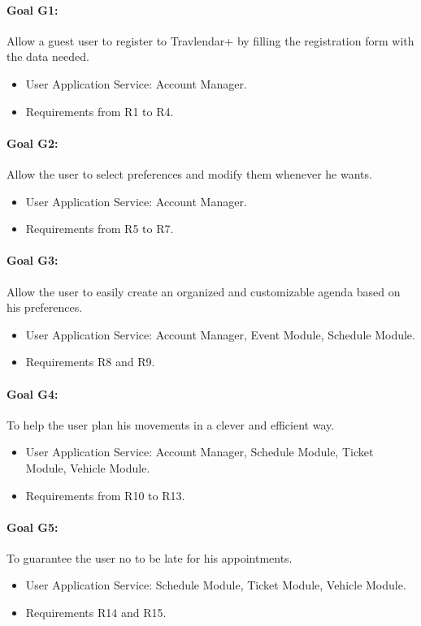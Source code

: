 \documentclass{article}
\begin{document}
		\paragraph{Goal G1:}Allow a guest user to register to Travlendar+ by filling the registration form with the data needed.
		\begin{itemize}
		\item{}User Application Service: Account Manager.
		\item{}Requirements from R1 to R4.
		\end{itemize}
		\paragraph{Goal G2:}Allow the user to select preferences and modify them whenever he wants.
		\begin{itemize}
		\item{}User Application Service: Account Manager.
		\item{}Requirements from R5 to R7.
		\end{itemize}
		\paragraph{Goal G3:}Allow the user to easily create an organized and customizable agenda based on his preferences.
		\begin{itemize}
		\item{}User Application Service: Account Manager, Event Module, Schedule Module.
		\item{}Requirements R8 and R9.
		\end{itemize}
		\paragraph{Goal G4:}To help the user plan his movements in a clever and efficient way.
		\begin{itemize}
		\item{}User Application Service: Account Manager, Schedule Module, Ticket Module, Vehicle Module.
		\item{}Requirements from R10 to R13.
		\end{itemize}
		\paragraph{Goal G5:}To guarantee the user no to be late for his appointments.
		\begin{itemize}
		\item{}User Application Service: Schedule Module, Ticket Module, Vehicle Module.
		\item{}Requirements R14 and R15.
		\end{itemize}
\end{document}
